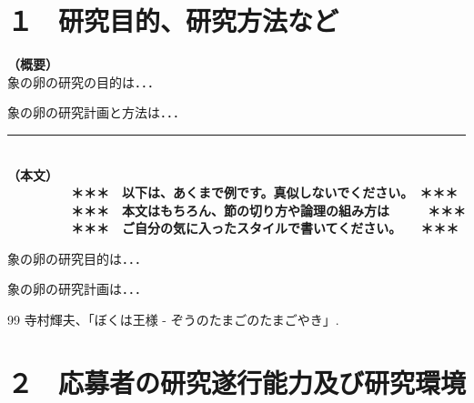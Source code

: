 \documentclass[11pt,a4j,dvipdfmx]{jarticle} 					%
\newcommand{\研究課題名}{象の卵}
\newcommand{\研究機関名}{逢坂大学}
\newcommand{\研究代表者氏名}{湯川秀樹}
\newcommand{\研究期間の最終元号年度}{10}  %
\begin{document}

\section{１　研究目的、研究方法など}

\JSPSInstructions		%
\noindent
\textbf{（概要）}\\
	象の卵の研究の目的は．．．	

	象の卵の研究計画と方法は．．．
	\vspace*{10zw}	%

\noindent
\rule{\linewidth}{1pt}\\
\noindent
\textbf{（本文）}
\textbf{\\　　　　　＊＊＊　以下は、あくまで例です。真似しないでください。　＊＊＊\\
　　　　　＊＊＊　本文はもちろん、節の切り方や論理の組み方は　　　＊＊＊\\
　　　　　＊＊＊　ご自分の気に入ったスタイルで書いてください。　　＊＊＊}

	 象の卵の研究目的は．．．

	象の卵の研究計画は．．．

		

	\vspace{1cm}
	\begin{thebibliography}{99}
		 寺村輝夫、「ぼくは王様 - ぞうのたまごのたまごやき」.
	\end{thebibliography}




\section{２　応募者の研究遂行能力及び研究環境}
\end{document}
